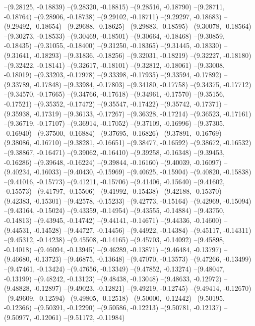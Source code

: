 --(9.28125, -0.18839)
--(9.28320, -0.18815)
--(9.28516, -0.18790)
--(9.28711, -0.18764)
--(9.28906, -0.18738)
--(9.29102, -0.18711)
--(9.29297, -0.18683)
--(9.29492, -0.18654)
--(9.29688, -0.18625)
--(9.29883, -0.18595)
--(9.30078, -0.18564)
--(9.30273, -0.18533)
--(9.30469, -0.18501)
--(9.30664, -0.18468)
--(9.30859, -0.18435)
--(9.31055, -0.18400)
--(9.31250, -0.18365)
--(9.31445, -0.18330)
--(9.31641, -0.18293)
--(9.31836, -0.18256)
--(9.32031, -0.18219)
--(9.32227, -0.18180)
--(9.32422, -0.18141)
--(9.32617, -0.18101)
--(9.32812, -0.18061)
--(9.33008, -0.18019)
--(9.33203, -0.17978)
--(9.33398, -0.17935)
--(9.33594, -0.17892)
--(9.33789, -0.17848)
--(9.33984, -0.17803)
--(9.34180, -0.17758)
--(9.34375, -0.17712)
--(9.34570, -0.17665)
--(9.34766, -0.17618)
--(9.34961, -0.17570)
--(9.35156, -0.17521)
--(9.35352, -0.17472)
--(9.35547, -0.17422)
--(9.35742, -0.17371)
--(9.35938, -0.17319)
--(9.36133, -0.17267)
--(9.36328, -0.17214)
--(9.36523, -0.17161)
--(9.36719, -0.17107)
--(9.36914, -0.17052)
--(9.37109, -0.16996)
--(9.37305, -0.16940)
--(9.37500, -0.16884)
--(9.37695, -0.16826)
--(9.37891, -0.16769)
--(9.38086, -0.16710)
--(9.38281, -0.16651)
--(9.38477, -0.16592)
--(9.38672, -0.16532)
--(9.38867, -0.16471)
--(9.39062, -0.16410)
--(9.39258, -0.16348)
--(9.39453, -0.16286)
--(9.39648, -0.16224)
--(9.39844, -0.16160)
--(9.40039, -0.16097)
--(9.40234, -0.16033)
--(9.40430, -0.15969)
--(9.40625, -0.15904)
--(9.40820, -0.15838)
--(9.41016, -0.15773)
--(9.41211, -0.15706)
--(9.41406, -0.15640)
--(9.41602, -0.15573)
--(9.41797, -0.15506)
--(9.41992, -0.15438)
--(9.42188, -0.15370)
--(9.42383, -0.15301)
--(9.42578, -0.15233)
--(9.42773, -0.15164)
--(9.42969, -0.15094)
--(9.43164, -0.15024)
--(9.43359, -0.14954)
--(9.43555, -0.14884)
--(9.43750, -0.14813)
--(9.43945, -0.14742)
--(9.44141, -0.14671)
--(9.44336, -0.14600)
--(9.44531, -0.14528)
--(9.44727, -0.14456)
--(9.44922, -0.14384)
--(9.45117, -0.14311)
--(9.45312, -0.14238)
--(9.45508, -0.14165)
--(9.45703, -0.14092)
--(9.45898, -0.14018)
--(9.46094, -0.13945)
--(9.46289, -0.13871)
--(9.46484, -0.13797)
--(9.46680, -0.13723)
--(9.46875, -0.13648)
--(9.47070, -0.13573)
--(9.47266, -0.13499)
--(9.47461, -0.13424)
--(9.47656, -0.13349)
--(9.47852, -0.13274)
--(9.48047, -0.13199)
--(9.48242, -0.13123)
--(9.48438, -0.13048)
--(9.48633, -0.12972)
--(9.48828, -0.12897)
--(9.49023, -0.12821)
--(9.49219, -0.12745)
--(9.49414, -0.12670)
--(9.49609, -0.12594)
--(9.49805, -0.12518)
--(9.50000, -0.12442)
--(9.50195, -0.12366)
--(9.50391, -0.12290)
--(9.50586, -0.12213)
--(9.50781, -0.12137)
--(9.50977, -0.12061)
--(9.51172, -0.11984)
